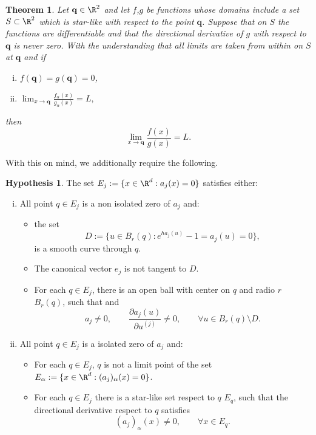 \documentclass[3p]{elsarticle}
\theoremstyle{definition}
\newtheorem{hypothesis}{Hypothesis}[section]
\theoremstyle{plain}%
\newtheorem{thm}{Theorem}[section]
\theoremstyle{remark}
\begin{document}
\begin{thm}\label{thm:Fine}
	Let $\mathbf{q}\in \R^2$ and let $f$,$g$ be functions whose domains include a set $S\subset \R^2$ which is 
	star-like 
	with  respect to the point $\mathbf{q}$. Suppose that on $S$ the functions are differentiable and that
	the directional derivative of $g$ with respect to $\mathbf{q}$ is never zero. With the understanding that all 
	limits are taken from within on $S$ at $\mathbf{q}$ and if
	\begin{enumerate}[(i)]
		\item 
			$f(\mathbf{q})=g(\mathbf{q})=0$,
		\item
			$
				\displaystyle
				\lim_{x \to \mathbf{q}}
				\frac{f_{\alpha}(x)}{g_{\alpha}(x)} = L,	
			$
	\end{enumerate}
	then
	$$
		\lim_{x \to \mathbf{q}}
		\frac{f(x)}{g(x)} = L.
	$$
\end{thm}
%
With this on mind, we additionally require the following. 
\begin{hypothesis}\label{ass:HypThmSingularities}
	The set $E_j:=\{x\in \R^{d}: a_j(x)=0\}$ satisfies either:
	\begin{enumerate}[(i)]
		\item
			All point $q \in E_j$ is a non isolated zero of $a_j$ and:
			\begin{itemize}
				\item the set 
					$$
						D:=\{u \in B_r(q): e^{ha_j(u)}-1=a_j(u)= 0\},
					$$ 
					is a smooth curve through $q$. 
				\item
					The canonical vector $e_j$ is not
					tangent to $D$.
				\item
					For each $q \in E_j$, there is an open ball with center
					on $q$ and radio $r$ $B_r(q)$, such that  
					and
					$$
						a_j\neq 0, \qquad
						\frac{\partial a_j(u)}{\partial u^{(j)}} \neq 0 ,\qquad 
						\forall u \in B_r(q)
						\setminus D.
					$$	
			\end{itemize}	
		\item
			All point $q \in E_j$ is a isolated zero of $a_j$ and:
			\begin{itemize}
				\item
					For each $q\in E_j$,  $q$ is not a limit point of the set 
					$E_{\alpha}:=\{x \in \R^d: (a_j)_\alpha(x)=0\}$.
				\item
					For each $q \in E_j$ there is a star-like set respect to $q$ $E_q$, such that
					the directional derivative respect to $q$ satisfies
					$$
						 (a_j)_\alpha(x) \neq 0, \qquad \forall x\in E_q.
					$$
			\end{itemize}		
	\end{enumerate}	
\end{hypothesis}
\end{document}
